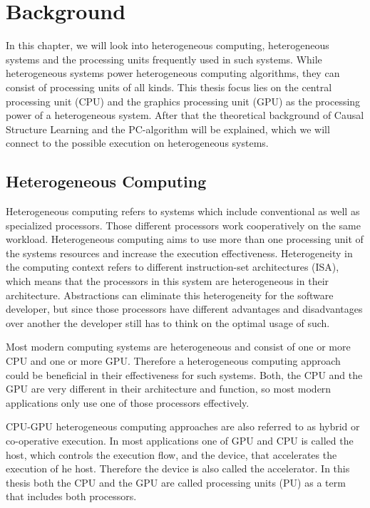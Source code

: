 \chapter{Background}
In this chapter, we will look into heterogeneous computing, heterogeneous systems and the processing units frequently used in such systems. While heterogeneous systems power heterogeneous computing algorithms, they can consist of processing units of all kinds. This thesis focus lies on the central processing unit (CPU) and the graphics processing unit (GPU) as the processing power of a heterogeneous system.
After that the theoretical background of Causal Structure Learning and the PC-algorithm will be explained, which we will connect to the possible execution on heterogeneous systems.

\section{Heterogeneous Computing}
Heterogeneous computing refers to systems which include conventional as well as specialized processors. Those different processors work cooperatively on the same workload. \cite{shan_heterogeneous_2006} Heterogeneous computing aims to use more than one processing unit of the systems resources and increase the execution effectiveness. Heterogeneity in the computing context refers to different instruction-set architectures (ISA), which means that the processors in this system are heterogeneous in their architecture.
Abstractions can eliminate this heterogeneity for the software developer, but since those processors have different advantages and disadvantages over another the developer still has to think on the optimal usage of such.

Most modern computing systems are heterogeneous and consist of one or more CPU and one or more GPU. Therefore a heterogeneous computing approach could be beneficial in their effectiveness for such systems. Both, the CPU and the GPU are very different in their architecture and function, so most modern applications only use one of those processors effectively.

CPU-GPU heterogeneous computing approaches are also referred to as hybrid or co-operative execution. In most applications one of GPU and CPU is called the host, which controls the execution flow, and the device, that accelerates the execution of he host. Therefore the device is also called the accelerator. In this thesis both the CPU and the GPU are called processing units (PU) as a term that includes both processors.

